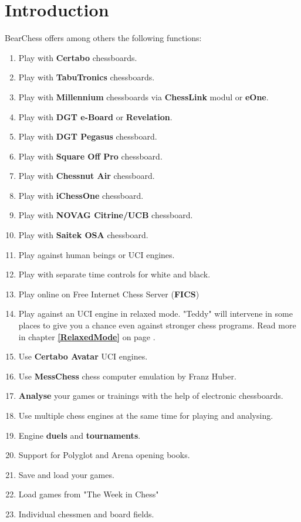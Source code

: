 \documentclass[11pt,a4paper]{article}
\begin{document}
\section{Introduction}
BearChess offers among others the following functions:
\begin{enumerate}
	  \item Play with \textbf{Certabo} chessboards.
	  \item Play with \textbf{TabuTronics} chessboards.	  
	  \item Play with \textbf{Millennium} chessboards via \textbf{ChessLink} modul or \textbf{eOne}.
 	  \item Play with \textbf{DGT e-Board} or \textbf{Revelation}.	  
	  \item Play with \textbf{DGT Pegasus} chessboard.	  
	  \item Play with \textbf{Square Off Pro} chessboard.	  	  
	  \item Play with \textbf{Chessnut Air} chessboard.	  	  	  
	  \item Play with \textbf{iChessOne} chessboard.	  	  	  	  
	  \item Play with \textbf{NOVAG Citrine/UCB} chessboard.
	  \item Play with \textbf{Saitek OSA} chessboard.	  
  	  \item Play against human beings or UCI engines.
  	  \item Play with separate time controls for white and black.
  	  \item Play online on Free Internet Chess Server (\textbf{FICS})
  	  \item Play against an UCI engine in relaxed mode. "Teddy" will intervene in some places to give you a chance even against stronger chess programs. Read more in chapter \textbf{\ref{RelaxedMode}  } on page \pageref{RelaxedMode}.  	  
  	  \item Use \textbf{Certabo Avatar} UCI engines.  	  
  	  \item Use \textbf{MessChess} chess computer emulation by Franz Huber.  	    	  
  	  \item \textbf{Analyse} your games or trainings with the help of electronic chessboards.
  	  \item Use multiple chess engines at the same time for playing and analysing.
  	  \item Engine \textbf{duels} and \textbf{tournaments}.
  	  \item Support for Polyglot and Arena opening books.
  	  \item Save and load your games.
  	  \item Load games from "The Week in Chess"
  	  \item Individual chessmen and board fields.
\end{enumerate}
\end{document}
